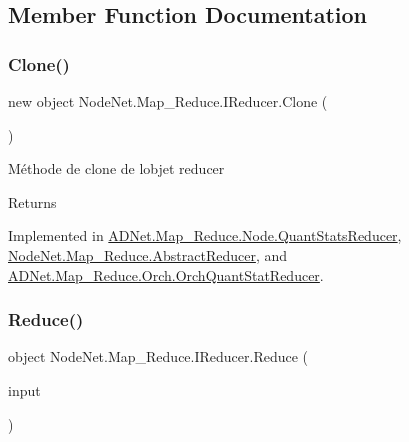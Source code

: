 \subsection{Member Function Documentation}
\mbox{\label{interface_node_net_1_1_map___reduce_1_1_i_reducer_a48dd811dab4aebe80a515bbaa4db8909}} 
\subsubsection{\texorpdfstring{Clone()}{Clone()}}
{\footnotesize\ttfamily new object Node\+Net.\+Map\+\_\+\+Reduce.\+I\+Reducer.\+Clone (\begin{DoxyParamCaption}{ }\end{DoxyParamCaption})}



Méthode de clone de l\textquotesingle{}objet reducer 

\begin{DoxyReturn}{Returns}

\end{DoxyReturn}


Implemented in \hyperlink{class_a_d_net_1_1_map___reduce_1_1_node_1_1_quant_stats_reducer_a3595f4275c71a2d373f12bd74e7f1da4}{A\+D\+Net.\+Map\+\_\+\+Reduce.\+Node.\+Quant\+Stats\+Reducer}, \hyperlink{class_node_net_1_1_map___reduce_1_1_abstract_reducer_a396b11f8b5285710be1565fac432df69}{Node\+Net.\+Map\+\_\+\+Reduce.\+Abstract\+Reducer}, and \hyperlink{class_a_d_net_1_1_map___reduce_1_1_orch_1_1_orch_quant_stat_reducer_aa4e7f32de6293b9265797dbb668e7dc2}{A\+D\+Net.\+Map\+\_\+\+Reduce.\+Orch.\+Orch\+Quant\+Stat\+Reducer}.

\mbox{\label{interface_node_net_1_1_map___reduce_1_1_i_reducer_a55b6605b1dda3d4fb9cdd361bec9a5cc}} 
\subsubsection{\texorpdfstring{Reduce()}{Reduce()}}
{\footnotesize\ttfamily object Node\+Net.\+Map\+\_\+\+Reduce.\+I\+Reducer.\+Reduce (\begin{DoxyParamCaption}\item[{Concurrent\+Bag$<$ object $>$}]{input }\end{DoxyParamCaption})}



